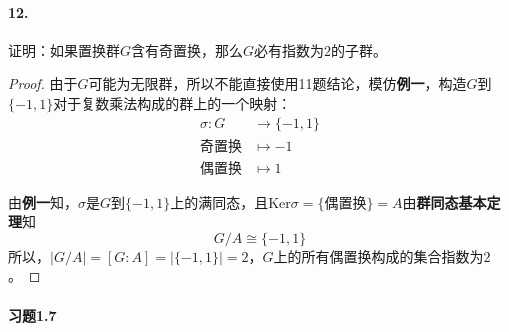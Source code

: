 \documentclass[12pt, a4paper, oneside]{ctexart}
\begin{document}
\paragraph{12.}证明：如果置换群$G$含有奇置换，那么$G$必有指数为$2$的子群。
\begin{proof}
    由于$G$可能为无限群，所以不能直接使用11题结论，模仿\textbf{例一}，构造$G$到$\{-1, 1\}$对于复数乘法构成的群上的一个映射：
    \begin{equation*}
        \begin{aligned}
           \sigma: G&\rightarrow \{-1, 1\}\\ 
           \text{奇置换}&\mapsto -1\\
           \text{偶置换}&\mapsto 1
        \end{aligned}
    \end{equation*}

    由\textbf{例一}知，$\sigma$是$G$到$\{-1, 1\}$上的满同态，且$\text{Ker}\sigma = \{\text{偶置换}\} = A$由\textbf{群同态基本定理}知
    \begin{equation*}
        G/A \cong \{-1, 1\}
    \end{equation*}
    所以，$|G/A| = [G:A] = |\{-1, 1\}| = 2$，$G$上的所有偶置换构成的集合指数为$2$。
\end{proof}

\paragraph{习题1.7}
\end{document}
